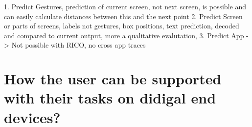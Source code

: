 1. Predict Gestures, prediction of current screen, not next screen, is possible and can easily calculate distances between this and the next point
2. Predict Screen or parts of screens, labels not gestures, box positions, text prediction, decoded and compared to current output, more a qualitative evalutation,
3. Predict App -> Not possible with RICO, no cross app traces

\section{How the user can be supported with their tasks on didigal end devices?}
